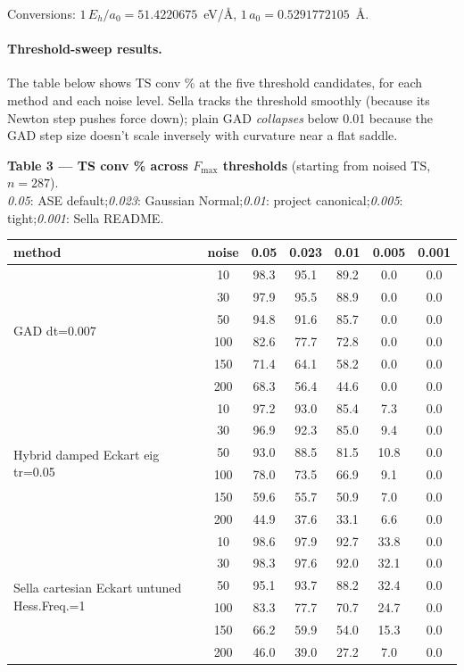 \documentclass[11pt]{article}
\begin{document}
Conversions: $1\,E_h/a_0 = 51.4220675$~eV/Å, $1\,a_0 = 0.5291772105$~Å.

\paragraph{Threshold-sweep results.} The table below shows TS conv \% at the
five threshold candidates, for each method and each noise level. Sella tracks
the threshold smoothly (because its Newton step pushes force down); plain
GAD \emph{collapses} below 0.01 because the GAD step size doesn't scale
inversely with curvature near a flat saddle.

\begin{center}\footnotesize
\textbf{Table 3 — TS conv \% across $F_\mathrm{max}$ thresholds} (starting from noised TS, $n=287$).\\
\textit{0.05}: ASE default;\quad\textit{0.023}: Gaussian Normal;\quad\textit{0.01}: project canonical;\quad\textit{0.005}: tight;\quad\textit{0.001}: Sella README.\\[0.3em]
\begin{tabular}{l|c|ccccc}
\toprule
\textbf{method} & \textbf{noise} & \textbf{0.05} & \textbf{0.023} & \textbf{0.01} & \textbf{0.005} & \textbf{0.001} \\
\midrule
\multirow{6}{*}{GAD dt=0.007}
 & 10  & 98.3 & 95.1 & 89.2 & 0.0  & 0.0 \\
 & 30  & 97.9 & 95.5 & 88.9 & 0.0  & 0.0 \\
 & 50  & 94.8 & 91.6 & 85.7 & 0.0  & 0.0 \\
 & 100 & 82.6 & 77.7 & 72.8 & 0.0  & 0.0 \\
 & 150 & 71.4 & 64.1 & 58.2 & 0.0  & 0.0 \\
 & 200 & 68.3 & 56.4 & 44.6 & 0.0  & 0.0 \\
\midrule
\multirow{6}{*}{Hybrid damped Eckart eig tr=0.05}
 & 10  & 97.2 & 93.0 & 85.4 & 7.3  & 0.0 \\
 & 30  & 96.9 & 92.3 & 85.0 & 9.4  & 0.0 \\
 & 50  & 93.0 & 88.5 & 81.5 & 10.8 & 0.0 \\
 & 100 & 78.0 & 73.5 & 66.9 & 9.1  & 0.0 \\
 & 150 & 59.6 & 55.7 & 50.9 & 7.0  & 0.0 \\
 & 200 & 44.9 & 37.6 & 33.1 & 6.6  & 0.0 \\
\midrule
\multirow{6}{*}{Sella cartesian Eckart untuned Hess.Freq.=1}
 & 10  & 98.6 & 97.9 & 92.7 & 33.8 & 0.0 \\
 & 30  & 98.3 & 97.6 & 92.0 & 32.1 & 0.0 \\
 & 50  & 95.1 & 93.7 & 88.2 & 32.4 & 0.0 \\
 & 100 & 83.3 & 77.7 & 70.7 & 24.7 & 0.0 \\
 & 150 & 66.2 & 59.9 & 54.0 & 15.3 & 0.0 \\
 & 200 & 46.0 & 39.0 & 27.2 & 7.0  & 0.0 \\
\bottomrule
\end{tabular}
\end{center}
\end{document}
